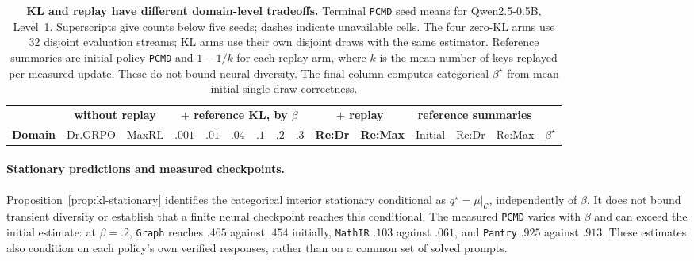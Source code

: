 \documentclass{article}
\newcommand{\1}{\mathbf 1}
\newcommand{\pmd}{\texttt{PCMD}}
\theoremstyle{remark}
\theoremstyle{definition}
\theoremstyle{plain}
\begin{document}
\begin{table}[t]
  \centering
  \caption{\textbf{KL and replay have different domain-level tradeoffs.}
  Terminal \pmd{} seed means for Qwen2.5-0.5B, Level~1. Superscripts give
  counts below five seeds; dashes indicate unavailable cells. The four
  zero-KL arms use 32 disjoint evaluation streams; KL arms use their own
  disjoint draws with the same estimator. Reference summaries are
  initial-policy \pmd{} and $1-1/\bar k$ for each replay arm, where $\bar k$
  is the mean number of keys replayed per measured update. These do not bound
  neural diversity. The final column computes categorical $\beta^\star$
  from mean initial single-draw correctness.}
  \label{tab:reference-kl-measured}
  \scriptsize
  \setlength{\tabcolsep}{2.5pt}
  \begin{tabular}{@{}lrrrrrrrrrrrrrr@{}}
    \toprule
    & \multicolumn{2}{c}{\textbf{without replay}}
      & \multicolumn{6}{c}{\textbf{$+$ reference KL, by $\beta$}}
      & \multicolumn{2}{c}{\textbf{$+$ replay}}
      & \multicolumn{3}{c}{\textbf{reference summaries}} & \\
    \cmidrule(lr){2-3}\cmidrule(lr){4-9}\cmidrule(lr){10-11}\cmidrule(lr){12-14}
    \textbf{Domain} & Dr.GRPO & MaxRL
      & $.001$ & $.01$ & $.04$ & $.1$ & $.2$ & $.3$
      & \textbf{Re:Dr} & \textbf{Re:Max}
      & Initial & Re:Dr & Re:Max & $\beta^\star$ \\
    \midrule
    
  \end{tabular}
\end{table}

\paragraph{Stationary predictions and measured checkpoints.}
Proposition~\ref{prop:kl-stationary} identifies the categorical interior
stationary conditional as $q^\star=\mu|_{\mathcal C}$, independently of
$\beta$. It does not bound transient diversity or establish that a finite
neural checkpoint reaches this conditional. The measured \pmd{} varies
with $\beta$ and can exceed the initial estimate: at $\beta=.2$, \texttt{Graph}
reaches $.465$ against $.454$ initially, \texttt{MathIR} $.103$ against $.061$,
and \texttt{Pantry} $.925$ against $.913$. These estimates also condition on each
policy's own verified responses, rather than on a common set of solved
prompts.
\end{document}
